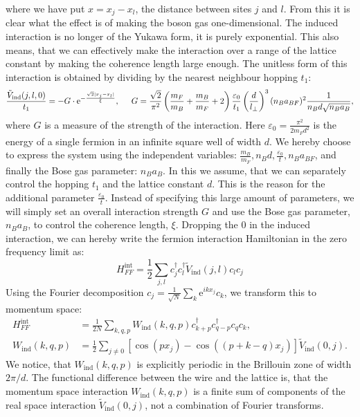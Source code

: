 where we have put $x = x_j - x_l$, the distance between sites $j$ and $l$. From this it is clear what the effect is of making the boson gas one-dimensional. The induced interaction is no longer of the Yukawa form, it is purely exponential. This also means, that we can effectively make the interaction over a range of the lattice constant by making the coherence length large enough. The unitless form of this interaction is obtained by dividing by the nearest neighbour hopping $t_1$:
\begin{equation}
\frac{\tilde{V}_{\text{ind}}(j, l, 0)}{t_1} = -G \cdot \text{e}^{-\frac{\sqrt{2}|x_j - x_l|}{\xi}}, \hspace{0.5cm} G = \frac{\sqrt{2}}{\pi^2} \left(\frac{m_F}{m_B} + \frac{m_B}{m_F} + 2\right)\frac{\varepsilon_0}{t_1}\left(\frac{d}{l_{\perp}}\right)^3 (n_Ba_{BF})^2 \frac{1}{n_Bd\sqrt{n_Ba_B}},
\label{eq.Inducedcinteractionrealspaceunitless.kitaevchain} 
\end{equation}
where $G$ is a measure of the strength of the interaction. Here $\varepsilon_0 = \frac{\pi^2}{2m_Fd^2}$ is the energy of a single fermion in an infinite square well of width $d$. We hereby choose to express the system using the independent variables: $\frac{m_B}{m_F}, n_Bd, \frac{\varepsilon_0}{t}, n_B a_{BF}$, and finally the Bose gas parameter: $n_B a_{B}$. In this we assume, that we can separately control the hopping $t_1$ and the lattice constant $d$. This is the reason for the additional parameter $\frac{\varepsilon_0}{t}$. Instead of specifying this large amount of parameters, we will simply set an overall interaction strength $G$ and use the Bose gas parameter, $n_B a_{B}$, to control the coherence length, $\xi$. Dropping the $0$ in the induced interaction, we can hereby write the fermion interaction Hamiltonian in the zero frequency limit as:
\begin{equation}
H^{\text{int}}_{FF} = \frac{1}{2}\sum_{j,l} c^\dagger_j c^\dagger_l \tilde{V}_{\text{ind}}(j, l) c_l c_j
\label{eq.Hintrealspace.lattice}
\end{equation}
Using the Fourier decomposition $c_j = \frac{1}{\sqrt{N}}\sum_k \text{e}^{ikx_j}c_k$, we transform this to momentum space:
\begin{align}
H^{\text{int}}_{FF} &= \frac{1}{2N} \sum_{k, q, p} W_{\text{ind}}(k, q, p) c^\dagger_{k + p} c^\dagger_{q - p} c_q c_k, \nonumber \\  
W_{\text{ind}}(k, q, p) &= \frac{1}{2}\sum_{j\neq 0} \left[\cos(px_j) - \cos((p + k - q)x_j) \right]\tilde{V}_{\text{ind}}(0, j). 
\label{eq.Hintmomentumspace.lattice}
\end{align}
We notice, that $W_{\text{ind}}(k, q, p)$ is explicitly periodic in the Brillouin zone of width $2\pi / d$. The functional difference between the wire and the lattice is, that the momentum space interaction $W_{\text{ind}}(k, q, p)$ is a finite sum of components of the real space interaction $\tilde{V}_{\text{ind}}(0, j)$, not a combination of Fourier transforms.

